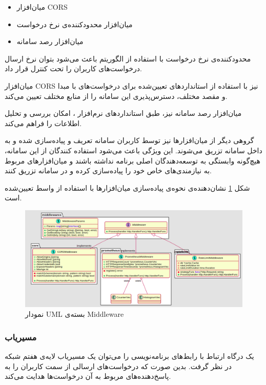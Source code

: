 \begin{itemize}
    \item میان‌افزار CORS
    \item میان‌افزار محدود‌کننده‌ی نرخ درخواست 
    \item میان‌افزار رصد سامانه
\end{itemize}

محدود‌کننده‌ی نرخ درخواست با استفاده از الگوریتم  باعث می‌شود بتوان نرخ ارسال درخواست‌های کاربران را تحت کنترل قرار داد.

میان‌افزار CORS نیز با استفاده از استاندارد‌های تعیین‌شده برای درخواست‌های با مبدا و مقصد مختلف، دسترس‌پذیری این سامانه‌ را از منابع مختلف تعیین می‌کند.

میان‌افزار رصد سامانه نیز، طبق استاندارد‌های نرم‌افزار ، امکان بررسی و تحلیل اطلاعات را فراهم می‌کند.

گروهی دیگر از میان‌افزار‌ها نیز توسط کاربران سامانه تعریف و پیاده‌سازی شده و به داخل سامانه تزریق می‌شوند. این ویژگی باعث می‌شود استفاده کنندگان از این سامانه، هیچ‌گونه وابستگی به توسعه‌دهندگان اصلی برنامه نداشته باشند و میان‌افزار‌های مربوط‌ به نیازمندی‌های خاص خود را پیاده‌سازی کرده و در سامانه تزریق کنند.

شکل
\ref{middlewares_package}
نشان‌دهنده‌ی نحوه‌ی پیاده‌سازی میان‌افزار‌ها با استفاده از واسط تعیین‌شده است.

\begin{figure}[H]
    \centering
    \caption{نمودار UML بسته‌ی Middleware}
    \label{middlewares_package}
    \includegraphics[scale=0.2]{images/Middleware.png}
\end{figure}

\subsubsection{مسیریاب}\label{subsec:impl_router}
یک درگاه ارتباط با رابط‌های برنامه‌نویسی را می‌توان یک مسیریاب لایه‌ی هفتم شبکه در نظر گرفت. بدین صورت که درخواست‌های ارسالی از سمت کاربران را به پاسخ‌دهنده‌های مربوط به آن‌ درخواست‌ها هدایت می‌کند.

